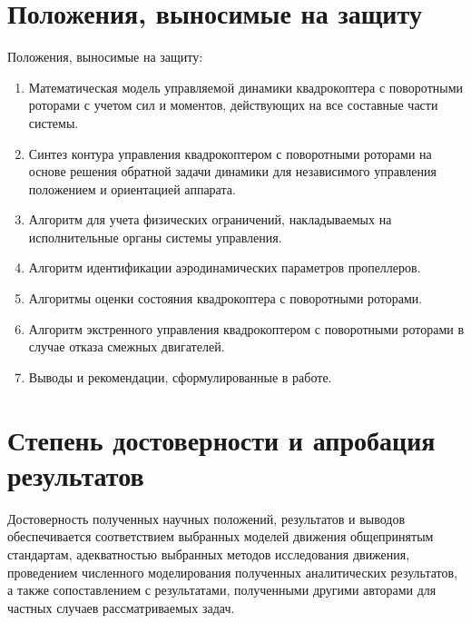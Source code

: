 \section{Положения, выносимые на защиту}
Положения, выносимые на защиту:
\begin{enumerate}
	\item Математическая модель управляемой динамики квадрокоптера с поворотными роторами с учетом сил и моментов, действующих на все составные части системы.
	\item Синтез контура управления квадрокоптером с поворотными роторами на основе решения обратной задачи динамики для независимого управления положением и ориентацией аппарата.
	\item Алгоритм для учета физических ограничений, накладываемых на исполнительные органы системы управления.
	\item Алгоритм идентификации аэродинамических параметров пропеллеров.
	\item Алгоритмы оценки состояния квадрокоптера с поворотными роторами.
	\item Алгоритм экстренного управления квадрокоптером с поворотными роторами в случае отказа смежных двигателей.
	\item Выводы и рекомендации, сформулированные в работе.
\end{enumerate}

\section{Степень достоверности и апробация результатов}
Достоверность полученных научных положений, результатов и выводов обеспечивается
соответствием выбранных моделей движения общепринятым стандартам,
адекватностью выбранных методов исследования движения,
проведением численного моделирования полученных аналитических результатов,
а также сопоставлением с результатами,
полученными другими авторами для частных случаев рассматриваемых задач.

